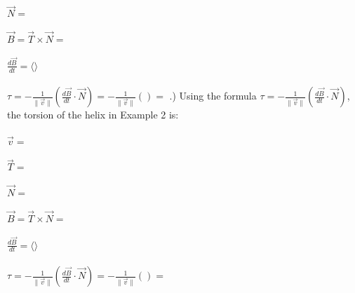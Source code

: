 \documentclass[12pt]{article}
\begin{document}
\noindent $\vec{N} = $\\\\
\noindent $\vec{B} = \vec{T} \times \vec{N} = $\\\\
\noindent $\frac{d\vec{B}}{dt} = \langle \rangle$\\\\
\noindent $\tau = -\frac{1}{\| \vec{v} \|}(\frac{d\vec{B}}{dt} \cdot \vec{N}) = -\frac{1}{\| \vec{v} \| } () = $
.) Using the formula $\tau = -\frac{1}{\| \vec{v} \|}(\frac{d\vec{B}}{dt} \cdot \vec{N})$, the torsion of the helix in Example 2 is:\\\\
\noindent $\vec{v} = $\\\\
\noindent $\vec{T} = $\\\\
\noindent $\vec{N} = $\\\\
\noindent $\vec{B} = \vec{T} \times \vec{N} = $\\\\
\noindent $\frac{d\vec{B}}{dt} = \langle \rangle$\\\\
\noindent $\tau = -\frac{1}{\| \vec{v} \|}(\frac{d\vec{B}}{dt} \cdot \vec{N}) = -\frac{1}{\| \vec{v} \| } () = $
\end{document}
